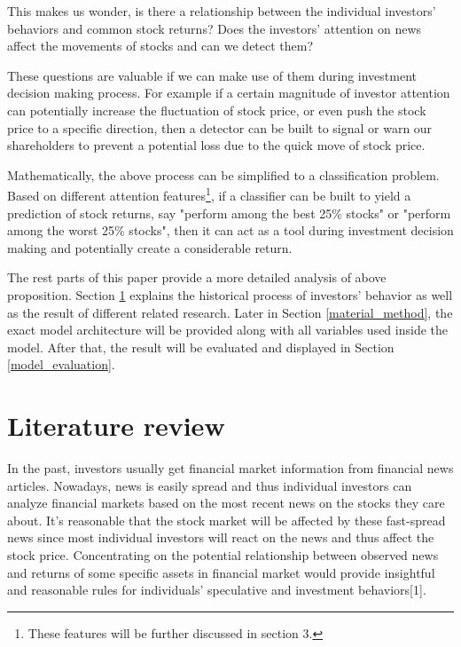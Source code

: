 \documentclass[letterpaper]{article}
\begin{document}
This makes us wonder, is there a relationship between the individual investors' behaviors and common stock returns? Does the investors' attention on news affect the movements of stocks and can we detect them?

These questions are valuable if we can make use of them during investment decision making process. For example if a certain magnitude of investor attention can potentially increase the fluctuation of stock price, or even push the stock price to a specific direction, then a detector can be built to signal or warn our shareholders to prevent a potential loss due to the quick move of stock price.

Mathematically, the above process can be simplified to a classification problem. Based on different attention features\footnote{These features will be further discussed in section 3.}, if a classifier can be built to yield a prediction of stock returns, say "perform among the best 25\% stocks" or "perform among the worst 25\% stocks", then it can act as a tool during investment decision making and potentially create a considerable return.

The rest parts of this paper provide a more detailed analysis of above proposition. Section \ref{literature_review} explains the historical process of investors' behavior as well as the result of different related research. Later in Section \ref{material_method}, the exact model architecture will be provided along with all variables used inside the model. After that, the result will be evaluated and displayed in Section \ref{model_evaluation}.


\section{Literature review}
\label{literature_review}

In the past, investors usually get financial market information from financial news articles. Nowadays, news is easily spread and thus individual investors can analyze financial markets based on the most recent news on the stocks they care about. It's reasonable that the stock market will be affected by these fast-spread news since most individual investors will react on the news and thus affect the stock price. Concentrating on the potential relationship between observed news and returns of some specific assets in financial market would provide insightful and reasonable rules for individuals' speculative and investment behaviors[1].
\end{document}
